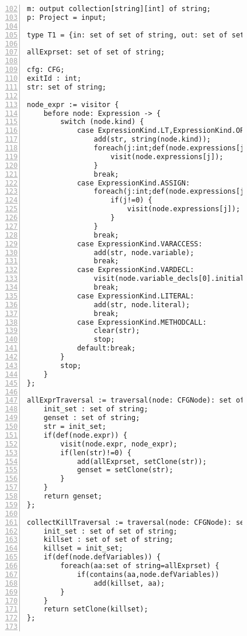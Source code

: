 \begin{figure}[ht!]
\begin{lstlisting}[numbers=left, tabsize=4, escapechar=@, caption={Very busy expression},label={lst:vbe-code},firstline=102, firstnumber=102] 
m: output collection[string][int] of string;
p: Project = input;

type T1 = {in: set of set of string, out: set of set of string};

allExprset: set of set of string;

cfg: CFG;
exitId : int;
str: set of string;

node_expr := visitor {
	before node: Expression -> {
		switch (node.kind) {
			case ExpressionKind.LT,ExpressionKind.OP_ADD, ExpressionKind.OP_SUB, ExpressionKind.OP_INC, ExpressionKind.OP_MULT, ExpressionKind.OP_DIV, ExpressionKind.OP_MOD, ExpressionKind.OP_DEC, ExpressionKind.GT, ExpressionKind.EQ, ExpressionKind.NEQ, ExpressionKind.LTEQ, ExpressionKind.GTEQ, ExpressionKind.LOGICAL_NOT, ExpressionKind.LOGICAL_AND, ExpressionKind.LOGICAL_OR, ExpressionKind.BIT_AND, ExpressionKind.BIT_OR, ExpressionKind.BIT_NOT, ExpressionKind.BIT_XOR, ExpressionKind.BIT_LSHIFT, ExpressionKind.BIT_RSHIFT, ExpressionKind.BIT_UNSIGNEDRSHIFT:
				add(str, string(node.kind)); 
				foreach(j:int;def(node.expressions[j])) {
					visit(node.expressions[j]);
				}
				break;
			case ExpressionKind.ASSIGN:
				foreach(j:int;def(node.expressions[j])) {
					if(j!=0) {
						visit(node.expressions[j]);
					}
				}
				break;
			case ExpressionKind.VARACCESS:
				add(str, node.variable);
				break;
			case ExpressionKind.VARDECL:
				visit(node.variable_decls[0].initializer);
				break;
			case ExpressionKind.LITERAL:
				add(str, node.literal);
				break;
			case ExpressionKind.METHODCALL:
				clear(str);
				stop;
			default:break;
		}
		stop;
	}
};

allExprTraversal := traversal(node: CFGNode): set of string {
	init_set : set of string;
	genset : set of string;
	str = init_set;
	if(def(node.expr)) {
		visit(node.expr, node_expr);
		if(len(str)!=0) {
			add(allExprset, setClone(str));
			genset = setClone(str);
		}
	}
	return genset;
};

collectKillTraversal := traversal(node: CFGNode): set of set of string {
	init_set : set of set of string;
	killset : set of set of string;
	killset = init_set;
	if(def(node.defVariables)) {
		foreach(aa:set of string=allExprset) {
			if(contains(aa,node.defVariables))
				add(killset, aa);
		}
	}
	return setClone(killset);
};


\end{lstlisting}
\end{figure}
